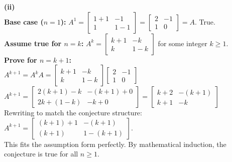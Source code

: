 \begin{solution}
\medskip
\textbf{(ii)} \\
\textbf{Base case ($n=1$):} $A^1 = \begin{bmatrix} 1+1 & -1 \\ 1 & 1-1 \end{bmatrix} = \begin{bmatrix} 2 & -1 \\ 1 & 0 \end{bmatrix} = A$. True. \\
\textbf{Assume true for $n=k$:} $A^k = \begin{bmatrix} k+1 & -k \\ k & 1-k \end{bmatrix}$ for some integer $k \ge 1$. \\
\textbf{Prove for $n=k+1$:} \\
$A^{k+1} = A^k A = \begin{bmatrix} k+1 & -k \\ k & 1-k \end{bmatrix} \begin{bmatrix} 2 & -1 \\ 1 & 0 \end{bmatrix}$ \\
$A^{k+1} = \begin{bmatrix} 2(k+1)-k & -(k+1)+0 \\ 2k+(1-k) & -k+0 \end{bmatrix} = \begin{bmatrix} k+2 & -(k+1) \\ k+1 & -k \end{bmatrix}$ \\
Rewriting to match the conjecture structure: \\
$A^{k+1} = \begin{bmatrix} (k+1)+1 & -(k+1) \\ (k+1) & 1-(k+1) \end{bmatrix}$. \\
This fits the assumption form perfectly. By mathematical induction, the conjecture is true for all $n \ge 1$.


\end{solution}
